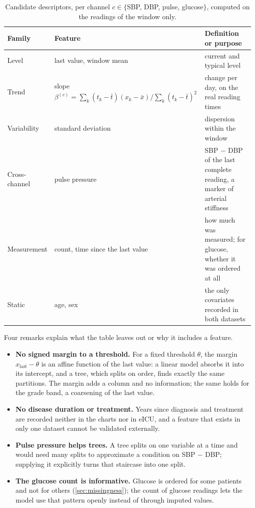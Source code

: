 \begin{table}[htbp]
\centering\footnotesize
\caption{Candidate descriptors, per channel $c \in \{$SBP, DBP, pulse, glucose$\}$, computed on the readings of the window only.}\label{tab:feature-families}
\begin{tabularx}{\textwidth}{@{}>{\raggedright\arraybackslash}p{2.4cm} >{\raggedright\arraybackslash}p{4.2cm} X@{}}
\toprule
\textbf{Family} & \textbf{Feature} & \textbf{Definition or purpose} \\
\midrule
Level & last value, window mean & current and typical level \\
Trend & slope $\beta^{(c)} = \sum_k (t_k - \bar t)(x_k - \bar x) / \sum_k (t_k - \bar t)^2$ & change per day, on the real reading times \\
Variability & standard deviation & dispersion within the window \\
Cross-channel & pulse pressure & SBP $-$ DBP of the last complete reading, a marker of arterial stiffness \\
Measurement & count, time since the last value & how much was measured; for glucose, whether it was ordered at all \\
Static & age, sex & the only covariates recorded in both datasets \\
\bottomrule
\end{tabularx}
\end{table}

Four remarks explain what the table leaves out or why it includes a feature.
\begin{itemize}
  \item \textbf{No signed margin to a threshold.} For a fixed threshold $\theta$, the margin $x_{\text{last}} - \theta$ is an affine function of the last value: a linear model absorbs it into its intercept, and a tree, which splits on order, finds exactly the same partitions. The margin adds a column and no information; the same holds for the grade band, a coarsening of the last value.
  \item \textbf{No disease duration or treatment.} Years since diagnosis and treatment are recorded neither in the charts nor in eICU, and a feature that exists in only one dataset cannot be validated externally.
  \item \textbf{Pulse pressure helps trees.} A tree splits on one variable at a time and would need many splits to approximate a condition on SBP $-$ DBP; supplying it explicitly turns that staircase into one split.
  \item \textbf{The glucose count is informative.} Glucose is ordered for some patients and not for others (\cref{sec:missingness}); the count of glucose readings lets the model use that pattern openly instead of through imputed values.
\end{itemize}

